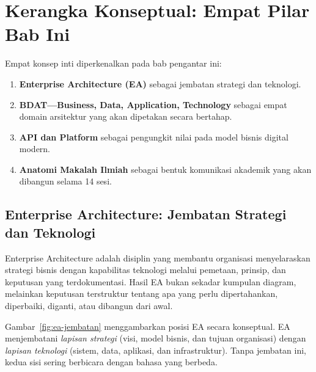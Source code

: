 \section{Kerangka Konseptual: Empat Pilar Bab Ini}

Empat konsep inti diperkenalkan pada bab pengantar ini:

\begin{enumerate}
  \item \textbf{Enterprise Architecture (EA)} sebagai jembatan strategi dan
        teknologi.
  \item \textbf{BDAT---Business, Data, Application, Technology} sebagai empat
        domain arsitektur yang akan dipetakan secara bertahap.
  \item \textbf{API dan Platform} sebagai pengungkit nilai pada model bisnis
        digital modern.
  \item \textbf{Anatomi Makalah Ilmiah} sebagai bentuk komunikasi akademik yang
        akan dibangun selama 14 sesi.
\end{enumerate}

\subsection{Enterprise Architecture: Jembatan Strategi dan Teknologi}

Enterprise Architecture adalah disiplin yang membantu organisasi menyelaraskan
strategi bisnis dengan kapabilitas teknologi melalui pemetaan, prinsip, dan
keputusan yang terdokumentasi. Hasil EA bukan sekadar kumpulan diagram,
melainkan keputusan terstruktur tentang apa yang perlu dipertahankan,
diperbaiki, diganti, atau dibangun dari awal.

Gambar~\ref{fig:ea-jembatan} menggambarkan posisi EA secara konseptual. EA
menjembatani \emph{lapisan strategi} (visi, model bisnis, dan tujuan
organisasi) dengan \emph{lapisan teknologi} (sistem, data, aplikasi, dan
infrastruktur). Tanpa jembatan ini, kedua sisi sering berbicara dengan bahasa
yang berbeda.


